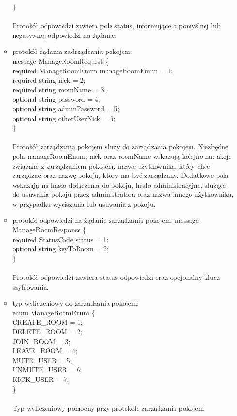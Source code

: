 \documentclass{article}
\begin{document}
\begin{itemize}
\begin{itemize}
				\}\\
				\\
				Protokół odpowiedzi zawiera pole status, informujące o pomyślnej lub negatywnej odpowiedzi na żądanie.
			\item protokół żądania zadrządzania pokojem:\\
				message ManageRoomRequest \{\\
					required ManageRoomEnum manageRoomEnum = 1;\\
					required string nick = 2;\\
					required string roomName = 3;\\
					optional string password = 4;\\
					optional string adminPassword = 5;\\
					optional string otherUserNick = 6;\\
				\}\\
				\\
				Protokół zarządzania pokojem służy do zarządzania pokojem. Niezbędne pola manageRoomEnum, nick oraz roomName wskazują kolejno na: akcje związane z zarządzaniem pokojem, nazwę użytkownika, który chce zarządzać oraz nazwę pokoju, który ma być zarządzany. Dodatkowe pola wskazują na hasło dołączenia do pokoju, hasło administracyjne, służące do usuwania pokoju przez administratora oraz nazwa innego użytkownika, w przypadku wyciszania lub usuwania z pokoju.
			\item protokół odpowiedzi na żądanie zarządzania pokojem:
				message ManageRoomResponse \{\\
					required StatusCode status = 1;\\
					optional string keyToRoom = 2;\\
				\}\\
				\\
				Protokół odpowiedzi zawiera status odpowiedzi oraz opcjonalny klucz szyfrowania.
			\item typ wyliczeniowy do zarządzania pokojem:\\
				enum ManageRoomEnum \{\\
					CREATE\_ROOM = 1;\\
					DELETE\_ROOM = 2;\\
					JOIN\_ROOM = 3;\\
					LEAVE\_ROOM = 4;\\
					MUTE\_USER = 5;\\
					UNMUTE\_USER = 6;\\
					KICK\_USER = 7;\\
				\}\\
				\\
				Typ wyliczeniowy pomocny przy protokole zarządzania pokojem.
				

\end{itemize}
\end{itemize}
\end{document}
